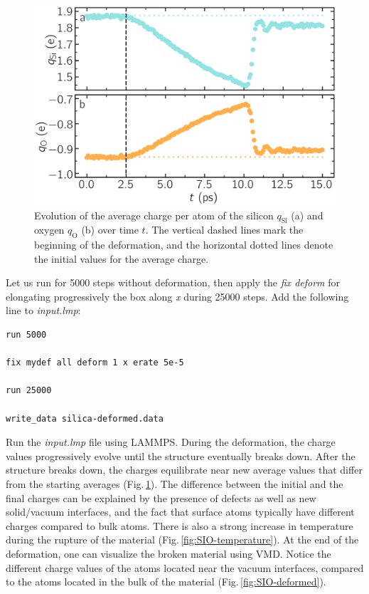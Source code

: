 \documentclass[9pt,tutorial]{livecoms}
\begin{document}
\begin{figure}
\includegraphics[width=\linewidth]{SIO-deformed-charge}
\caption{Evolution of the average charge per atom of the silicon $q_\text{Si}$
(a) and oxygen $q_\text{O}$ (b) over time $t$. The vertical dashed lines mark
the beginning of the deformation, and the horizontal dotted lines denote the
initial values for the average charge.}
\label{fig:SIO-deformed-charge}
\end{figure}

Let us run for 5000 steps without deformation, then apply the \textit{fix deform}
for elongating progressively the box along \textit{x} during 25000 steps. Add
the following line to \textit{input.lmp}:
{\normalsize \begin{verbatim}
run 5000

fix mydef all deform 1 x erate 5e-5

run 25000

write_data silica-deformed.data
\end{verbatim}}
Run the \textit{input.lmp} file using LAMMPS. During the deformation, the charge
values progressively evolve until the structure eventually breaks down. After the
structure breaks down, the charges equilibrate near new average values that differ
from the starting averages (Fig.\,\ref{fig:SIO-deformed-charge}). The difference
between the initial and the final charges can be explained by the presence of
defects as well as new solid/vacuum interfaces, and the fact that surface atoms
typically have different charges compared to bulk atoms. There is also a strong
increase in temperature during the rupture of the material (Fig.\,\ref{fig:SIO-temperature}).
At the end of the deformation, one can visualize the broken material using VMD.
Notice the different charge values of the atoms located near the vacuum interfaces,
compared to the atoms located in the bulk of the material (Fig.\,\ref{fig:SIO-deformed}).
\end{document}
